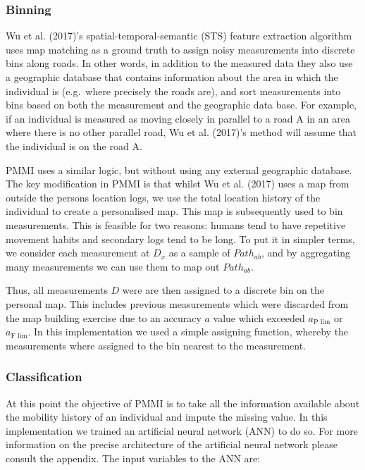 \documentclass[man]{apa6}
\theoremstyle{definition}
\theoremstyle{definition}
\theoremstyle{definition}
\theoremstyle{remark}
\begin{document}
\subsubsection{Binning}\label{binning}

Wu et al. (2017)'s spatial-temporal-semantic (STS) feature extraction
algorithm uses map matching as a ground truth to assign noisy
measurements into discrete bins along roads. In other words, in addition
to the measured data they also use a geographic database that contains
information about the area in which the individual is (e.g.~where
precisely the roads are), and sort measurements into bins based on both
the measurement and the geographic data base. For example, if an
individual is measured as moving closely in parallel to a road A in an
area where there is no other parallel road, Wu et al. (2017)'s method
will assume that the individual is on the road A.

PMMI uses a similar logic, but without using any external geographic
database. The key modification in PMMI is that whilst Wu et al. (2017)
uses a map from outside the persons location logs, we use the total
location history of the individual to create a personalised map. This
map is subsequently used to bin measurements. This is feasible for two
reasons: humans tend to have repetitive movement habits and secondary
logs tend to be long. To put it in simpler terms, we consider each
measurement at \(D_x\) as a sample of \(Path_{ab}\), and by aggregating
many measurements we can use them to map out \(Path_{ab}\).

Thus, all measurements \(D\) were are then assigned to a discrete bin on
the personal map. This includes previous measurements which were
discarded from the map building exercise due to an accuracy \(a\) value
which exceeded \(a_{\text{P lim}}\) or \(a_{\text{F lim}}\). In this
implementation we used a simple assigning function, whereby the
measurements where assigned to the bin nearest to the measurement.

\subsubsection{Classification}\label{classification}

At this point the objective of PMMI is to take all the information
available about the mobility history of an individual and impute the
missing value. In this implementation we trained an artificial neural
network (ANN) to do so. For more information on the precise architecture
of the artificial neural network please consult the appendix. The input
variables to the ANN are:
\end{document}
